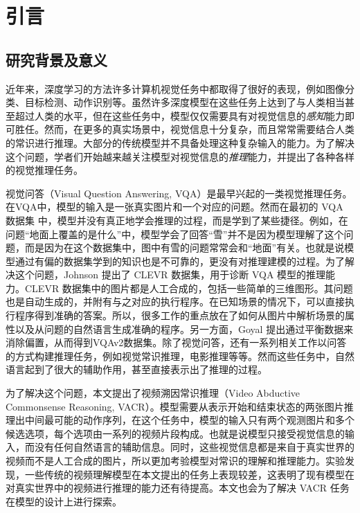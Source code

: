 
\chapter{引言}
\label{cha:intro}

\section{研究背景及意义}
近年来，深度学习的方法许多计算机视觉任务中都取得了很好的表现，例如图像分类\cite{he2016deep,krizhevsky2012imagenet}、目标检测\cite{ren2015faster}、动作识别\cite{wang2016temporal,tran2018closer,carreira2017quo}等。虽然许多深度模型在这些任务上达到了与人类相当甚至超过人类的水平，但在这些任务中，模型仅仅需要具有对视觉信息的\emph{感知}能力即可胜任。然而，在更多的真实场景中，视觉信息十分复杂，而且常常需要结合人类的常识进行推理。大部分的传统模型并不具备处理这种复杂输入的能力。为了解决这个问题，学者们开始越来越关注模型对视觉信息的\emph{推理}能力，并提出了各种各样的视觉推理任务。

视觉问答（Visual Question Answering, VQA）是最早兴起的一类视觉推理任务\cite{antol2015vqa}。在VQA中，模型的输入是一张真实图片和一个对应的问题。然而在最初的 VQA 数据集\cite{antol2015vqa} 中，模型并没有真正地学会推理的过程，而是学到了某些捷径\cite{johnson2017clevr}。例如，在问题“地面上覆盖的是什么”中，模型学会了回答“雪”并不是因为模型理解了这个问题，而是因为在这个数据集中，图中有雪的问题常常会和“地面”有关。也就是说模型通过有偏的数据集学到的知识也是不可靠的，更没有对推理建模的过程。为了解决这个问题，Johnson \etal \cite{johnson2017clevr} 提出了 CLEVR 数据集，用于诊断 VQA 模型的推理能力。CLEVR 数据集中的图片都是人工合成的，包括一些简单的三维图形。其问题也是自动生成的，并附有与之对应的执行程序。在已知场景的情况下，可以直接执行程序得到准确的答案。所以，很多工作的重点放在了如何从图片中解析场景的属性以及从问题的自然语言生成准确的程序\cite{Johnson_2017_ICCV,yi2018neural,vedantam2019probabilistic}。另一方面，Goyal \etal\cite{goyal2017making}提出通过平衡数据来消除偏置，从而得到VQAv2数据集。除了视觉问答，还有一系列相关工作以问答的方式构建推理任务，例如视觉常识推理\cite{zellers2019recognition}，电影推理\cite{tapaswi2016movieqa}等等。然而这些任务中，自然语言起到了很大的辅助作用，甚至直接表示出了推理的过程。

为了解决这个问题，本文提出了视频溯因常识推理（Video Abductive Commonsense Reasoning, VACR）。模型需要从表示开始和结束状态的两张图片推理出中间最可能的动作序列，在这个任务中，模型的输入只有两个观测图片和多个候选选项，每个选项由一系列的视频片段构成。也就是说模型只接受视觉信息的输入，而没有任何自然语言的辅助信息。同时，这些视觉信息都是来自于真实世界的视频而不是人工合成的图片，所以更加考验模型对常识的理解和推理能力。实验发现，一些传统的视频理解模型在本文提出的任务上表现较差，这表明了现有模型在对真实世界中的视频进行推理的能力还有待提高。本文也会为了解决 VACR 任务在模型的设计上进行探索。

